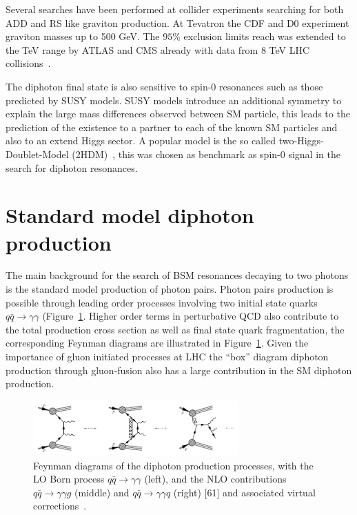 Several searches have been performed at collider experiments searching for both ADD and RS like graviton
production. At Tevatron the CDF and D0 experiment graviton masses up to 500 GeV\cite{cdf_dipho, d0_dipho}.
The $95\%$ exclusion limits reach was extended to the TeV range by ATLAS and CMS already with data from 8 TeV LHC
collisions~\cite{atlas_dipho_2012, cms_dipho_2012_1}.

The diphoton final state is also sensitive to spin-0 resonances such as those predicted by SUSY models. SUSY models
introduce an additional symmetry to explain the large mass differences observed between SM particle, this leads
to the prediction of the existence to a partner to each of the known SM particles and also to an extend Higgs sector.
A popular model is the so called two-Higgs-Doublet-Model (2HDM)~\cite{spin0_1,spin0_2}, this was chosen as benchmark as
spin-0 signal in the search for diphoton resonances.

\section{Standard model diphoton production}
\label{sec:sm_dipho_prod}
The main background for the search of BSM resonances decaying to two photons is the standard model production
of photon pairs. Photon pairs production is possible through leading order processes involving two
initial state quarks $q\bar{q}\to\gamma\gamma$ (Figure~\ref{fig:lo_dipho}. Higher order terms in perturbative QCD also contribute to
the total production cross section as well as final state quark fragmentation,
the corresponding Feynman diagrams are illustrated in Figure~\ref{fig:lo_dipho}.
Given the importance of gluon initiated processes at LHC the ``box'' diagram diphoton production through gluon-fusion
also has a large contribution in the SM diphoton production.

\begin{figure}[hb]
  \centering
  \includegraphics[width = 0.7\textwidth]{figures/introduction/lo.png}
  \caption{
    Feynman diagrams of the diphoton production processes, with the LO Born
    process $q\bar{q}\to\gamma\gamma$ (left), and the NLO contributions $q\bar{q}\to\gamma\gamma g$ (middle) and
    $q\bar{q}\to\gamma\gamma q$ (right) [61] and associated virtual corrections~\cite{61}.
  }
  \label{fig:lo_dipho}
\end{figure}

